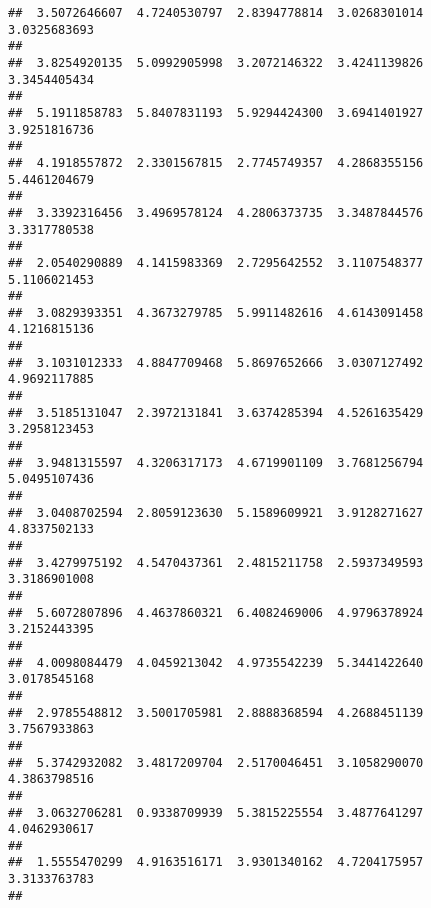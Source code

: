 \documentclass[]{article}
\begin{document}
\begin{verbatim}
##  3.5072646607  4.7240530797  2.8394778814  3.0268301014  3.0325683693 
##                                                                       
##  3.8254920135  5.0992905998  3.2072146322  3.4241139826  3.3454405434 
##                                                                       
##  5.1911858783  5.8407831193  5.9294424300  3.6941401927  3.9251816736 
##                                                                       
##  4.1918557872  2.3301567815  2.7745749357  4.2868355156  5.4461204679 
##                                                                       
##  3.3392316456  3.4969578124  4.2806373735  3.3487844576  3.3317780538 
##                                                                       
##  2.0540290889  4.1415983369  2.7295642552  3.1107548377  5.1106021453 
##                                                                       
##  3.0829393351  4.3673279785  5.9911482616  4.6143091458  4.1216815136 
##                                                                       
##  3.1031012333  4.8847709468  5.8697652666  3.0307127492  4.9692117885 
##                                                                       
##  3.5185131047  2.3972131841  3.6374285394  4.5261635429  3.2958123453 
##                                                                       
##  3.9481315597  4.3206317173  4.6719901109  3.7681256794  5.0495107436 
##                                                                       
##  3.0408702594  2.8059123630  5.1589609921  3.9128271627  4.8337502133 
##                                                                       
##  3.4279975192  4.5470437361  2.4815211758  2.5937349593  3.3186901008 
##                                                                       
##  5.6072807896  4.4637860321  6.4082469006  4.9796378924  3.2152443395 
##                                                                       
##  4.0098084479  4.0459213042  4.9735542239  5.3441422640  3.0178545168 
##                                                                       
##  2.9785548812  3.5001705981  2.8888368594  4.2688451139  3.7567933863 
##                                                                       
##  5.3742932082  3.4817209704  2.5170046451  3.1058290070  4.3863798516 
##                                                                       
##  3.0632706281  0.9338709939  5.3815225554  3.4877641297  4.0462930617 
##                                                                       
##  1.5555470299  4.9163516171  3.9301340162  4.7204175957  3.3133763783 
##                                                                       

\end{verbatim}
\end{document}
